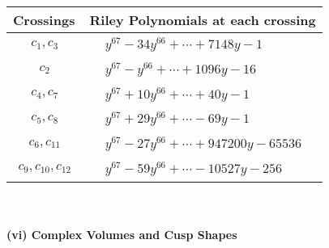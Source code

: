 \documentclass[1p]{elsarticle_modified}
\theoremstyle{definition}
\begin{document}
\begin{tabular}{m{50pt}|m{274pt}}
Crossings & \hspace{64pt}Riley Polynomials at each crossing \\
\hline $$\begin{aligned}c_{1},c_{3}\end{aligned}$$&$\begin{aligned}
&y^{67}-34 y^{66}+\cdots+7148 y-1
\end{aligned}$\\
\hline $$\begin{aligned}c_{2}\end{aligned}$$&$\begin{aligned}
&y^{67}- y^{66}+\cdots+1096 y-16
\end{aligned}$\\
\hline $$\begin{aligned}c_{4},c_{7}\end{aligned}$$&$\begin{aligned}
&y^{67}+10 y^{66}+\cdots+40 y-1
\end{aligned}$\\
\hline $$\begin{aligned}c_{5},c_{8}\end{aligned}$$&$\begin{aligned}
&y^{67}+29 y^{66}+\cdots-69 y-1
\end{aligned}$\\
\hline $$\begin{aligned}c_{6},c_{11}\end{aligned}$$&$\begin{aligned}
&y^{67}-27 y^{66}+\cdots+947200 y-65536
\end{aligned}$\\
\hline $$\begin{aligned}c_{9},c_{10},c_{12}\end{aligned}$$&$\begin{aligned}
&y^{67}-59 y^{66}+\cdots-10527 y-256
\end{aligned}$\\
\hline
\end{tabular}\\~\\
\newpage\flushleft \textbf{(vi) Complex Volumes and Cusp Shapes}
\end{document}
